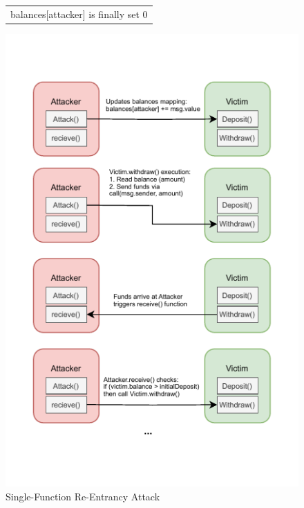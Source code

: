 \documentclass[12pt]{article}
\begin{document}
\begin{figure}[H]
\begin{minipage}{0.45\textwidth}
{\begin{tabular}{l}
                balances[attacker] is finally set 0                        \\
            \end{tabular}
        }
    \end{minipage}\hfill
    \begin{minipage}{0.45\textwidth}
        \centering
        \includegraphics[width=\textwidth]{reentrancy.pdf}
    \end{minipage}
    \caption{Single-Function Re-Entrancy Attack}
    \label{fig:reentrancy}
\end{figure}
\end{document}
